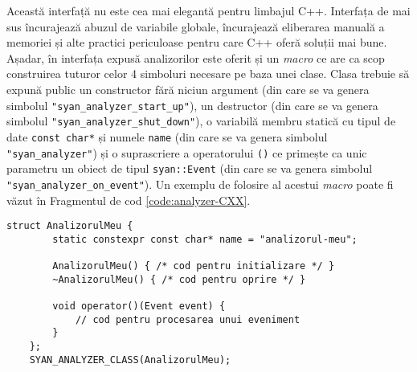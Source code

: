 Această interfață nu este cea mai elegantă pentru limbajul C++.
Interfața de mai sus încurajează abuzul de variabile globale,
încurajează eliberarea manuală a memoriei și alte practici periculoase
pentru care C++ oferă soluții mai bune. Așadar, în interfața expusă
analizorilor este oferit și un \textit{macro} ce are ca scop construirea
tuturor celor 4 simboluri necesare pe baza unei clase. Clasa trebuie să
expună public un constructor fără niciun argument (din care se va genera
simbolul \lstinline{"syan_analyzer_start_up"}), un destructor (din care
se va genera simbolul \lstinline{"syan_analyzer_shut_down"}), o
variabilă membru statică cu tipul de date \lstinline{const char*} și
numele \lstinline{name} (din care se va genera simbolul
\lstinline{"syan_analyzer"}) și o suprascriere a operatorului
\lstinline{()} ce primește ca unic parametru un obiect de tipul
\lstinline{syan::Event} (din care se va genera simbolul
\lstinline{"syan_analyzer_on_event"}). Un exemplu de folosire al acestui
\textit{macro} poate fi văzut în Fragmentul de cod
\ref{code:analyzer-CXX}.

\begin{lstlisting}[caption=Interfața pe bază de clasă a unui analizor,
                   label=code:analyzer-CXX]
    struct AnalizorulMeu {
        static constexpr const char* name = "analizorul-meu";

        AnalizorulMeu() { /* cod pentru initializare */ }
        ~AnalizorulMeu() { /* cod pentru oprire */ }

        void operator()(Event event) {
            // cod pentru procesarea unui eveniment
        }
    };
    SYAN_ANALYZER_CLASS(AnalizorulMeu);
\end{lstlisting}
